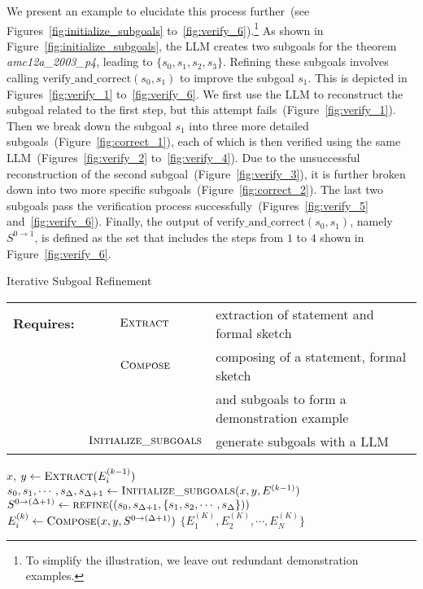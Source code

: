 \documentclass{article}
\begin{document}
We present an example to elucidate this process further~(see Figures~\ref{fig:initialize_subgoals} to~\ref{fig:verify_6}).\footnote{To simplify the illustration, we leave out redundant demonstration examples.} As shown in Figure~\ref{fig:initialize_subgoals}, the LLM creates two subgoals for the theorem \emph{amc12a\_2003\_p4}, leading to $\{s_0, s_1, s_2, s_3\}$.  Refining these subgoals involves calling $\mathrm{verify\_and\_correct}(s_0, s_1)$ to improve the subgoal $s_1$. This is depicted in Figures~\ref{fig:verify_1} to~\ref{fig:verify_6}.  We first use the LLM to reconstruct the subgoal related to the first step, but this attempt fails~(Figure~\ref{fig:verify_1}). Then we break down the subgoal $s_1$ into three more detailed subgoals~(Figure~\ref{fig:correct_1}), each of which is then verified using the same LLM~(Figures~\ref{fig:verify_2} to~\ref{fig:verify_4}). Due to the unsuccessful reconstruction of the second subgoal~(Figure~\ref{fig:verify_3}), it is further broken down into two more specific subgoals~(Figure~\ref{fig:correct_2}). The last two subgoals pass the verification process successfully~(Figures~\ref{fig:verify_5} and~\ref{fig:verify_6}). Finally, the output of $\mathrm{verify\_and\_correct}(s_0, s_1)$, namely $S^{0\rightarrow 1}$, is defined as the set that includes the steps from $1$ to $4$ shown in Figure~\ref{fig:verify_6}.


\begin{algorithm}[]
\caption{Iterative Subgoal Refinement}
    \label{alg:subgoal_refinement}
\begin{tabular}{ l c l }
    \textbf{Requires: }
    & $\Call{Extract}{}$ & extraction of statement and formal sketch  \\
    & $\Call{Compose}{}$ & composing of a statement, formal sketch \\ 
    & & and subgoals to form a demonstration example \\
    & $\Call{Initialize\_subgoals}{}$ & generate subgoals with a LLM \\ 
\end{tabular}
\begin{algorithmic}
                \State $x$, $y\gets \Call{Extract}{E^{(k-1)}_{i}}$
                \State $s_0, s_1, \cdots, s_{\Delta}, s_{\Delta+1}\gets \Call{Initialize\_subgoals}{x, y, E^{(k-1)}}$
                \State $S^{0\rightarrow (\Delta+1)}\gets \Call{refine}{(s_0, s_{\Delta+1}, \{s_1, s_2, \cdots, s_{\Delta}\})}$
                \State $E^{(k)}_i\gets \Call{Compose}{x, y, S^{0\rightarrow (\Delta+1)}}$
            \EndFor
        \EndFor
        \State \Return $\{E^{(K)}_1, E^{(K)}_2, \cdots, E^{(K)}_N\}$
    \EndFunction
\end{algorithmic}
\end{algorithm}
\end{document}
